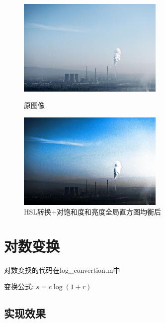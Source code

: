 \documentclass[11pt, a4paper, UTF8]{ctexart}
\begin{document}
\begin{figure}[H]
  \centering
  \begin{minipage}[t]{0.48\textwidth}
  \centering
  \includegraphics[width=7cm]{color.jpg}
  \caption{原图像}
  \end{minipage}
  \begin{minipage}[t]{0.48\textwidth}
  \centering
  \includegraphics[width=7cm]{color_hsl_s+l_global_converted.jpg}
  \caption{HSL转换+对饱和度和亮度全局直方图均衡后}
  \end{minipage}
\end{figure}


\section{对数变换}
对数变换的代码在log\_convertion.m中 \par 
变换公式: $s = c \log (1+r)$

\subsection{实现效果}
\end{document}
